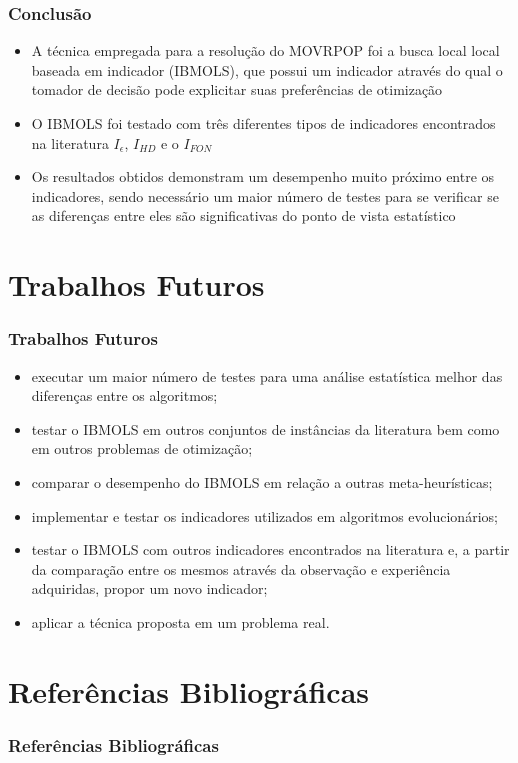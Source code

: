 \documentclass{beamer}
\begin{document}
\begin{frame}
  \frametitle{Conclusão}
    
    \begin{itemize}
    \item A técnica empregada para a resolução do MOVRPOP foi a busca local local baseada em indicador (IBMOLS), que possui um indicador através do qual o tomador de 
    decisão pode explicitar suas preferências de otimização
    \item O IBMOLS foi testado com três diferentes tipos de indicadores encontrados na literatura $I_{\epsilon}$, $I_{HD}$ e o $I_{FON}$
    \item Os resultados obtidos demonstram um desempenho muito próximo entre os indicadores, sendo necessário um maior número de testes para se verificar se as diferenças
    entre eles são significativas do ponto de vista estatístico
    \end{itemize}
  
\end{frame}

\section{Trabalhos Futuros}
\begin{frame}
  \frametitle{Trabalhos Futuros}
    
    \begin{itemize}
    \item executar um maior número de testes para uma análise estatística melhor das diferenças entre os algoritmos;
    \item testar o IBMOLS em outros conjuntos de instâncias da literatura bem como em outros problemas de otimização;
    \item comparar o desempenho do IBMOLS em relação a outras meta-heurísticas;
    \item implementar e testar os indicadores utilizados em algoritmos evolucionários;
    \item testar o IBMOLS com outros indicadores encontrados na literatura e, a partir da comparação entre os mesmos através da observação e experiência adquiridas, 
    propor um novo indicador;
    \item aplicar a técnica proposta em um problema real.
    \end{itemize}
  
\end{frame}

\begin{frame}
    \cite{gonccalves2005proposta}
        
    \cite{de2003educaccao}

    \cite{Kuruatuba2011}

    \cite{elias}

    \cite{Sommerville}
\end{frame}

    

\section{Referências Bibliográficas}

\begin{frame}
    \frametitle{Referências Bibliográficas}
    \scriptsize{  
        
        
    }
  
\end{frame}
\end{document}
